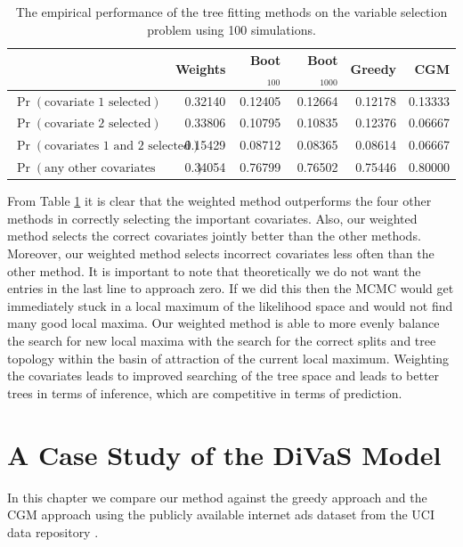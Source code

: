 
\begin{table}[ht]
\begin{center}
\begin{tabular}{l | rrrrr}
  \hline
  & Weights & Boot$_{100}$ & Boot$_{1000}$ & Greedy & CGM \\ 
  \hline
$\Pr(\text{covariate 1 selected})$ & 0.32140 & 0.12405 & 0.12664 & 0.12178 & 0.13333 \\ 
$\Pr(\text{covariate 2 selected})$ & 0.33806 & 0.10795 & 0.10835 & 0.12376 & 0.06667 \\ 
  $\Pr(\text{covariates 1 and 2 selected})$& 0.15429 & 0.08712 & 0.08365 & 0.08614 & 0.06667 \\ 
  $\Pr(\text{any other covariates  selected})$ & 0.34054 & 0.76799 & 0.76502 & 0.75446 & 0.80000 \\ 
   \hline
\end{tabular}
 \caption[Empirical covariate selection with 100 simulations.]{The empirical performance of the tree fitting methods on the variable selection problem using 100 simulations.}
 \label{tab:sim_study}
 \end{center}
\end{table}


From Table \ref{tab:sim_study} it is clear that the weighted method outperforms the four other methods in correctly selecting the important covariates. Also, our weighted method selects the correct covariates jointly better than the other methods. Moreover, our weighted method selects incorrect covariates less often than the other method. It is important to note that theoretically we do not want the entries in the last line to approach zero. If we did this then the MCMC would get immediately stuck in a local maximum of the likelihood space and would not find many good local maxima. Our weighted method is able to more evenly balance the search for new local maxima with the search for the correct splits and tree topology within the basin of attraction of the current local maximum. Weighting the covariates leads to improved searching of the tree space and leads to better trees in terms of inference, which are competitive in terms of prediction.  

\newpage

\chapter{A Case Study of the DiVaS Model}\label{sec:real_data}
In this chapter we compare our method against the greedy approach and the CGM approach using the publicly available internet ads dataset from the UCI data repository \cite{Frank:2010uq}. 

